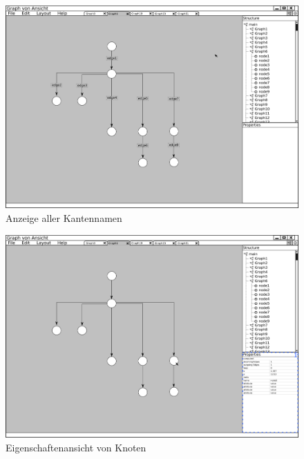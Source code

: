 \begin{figure}[ht]
  \centering
  \includegraphics[width=380pt]{resourcen/gui_view_showInfoInView_edge_all.png}
  \caption{Anzeige aller Kantennamen}
  \label{fig:gui_view_showInfoInView_edge_all}
\end{figure}

\begin{figure}[ht]
  \centering
  \includegraphics[width=380pt]{resourcen/gui_view_showInfoInProperties_node.png}
  \caption{Eigenschaftenansicht von Knoten}
  \label{fig:gui_view_showInfoInProperties_node}
\end{figure}

